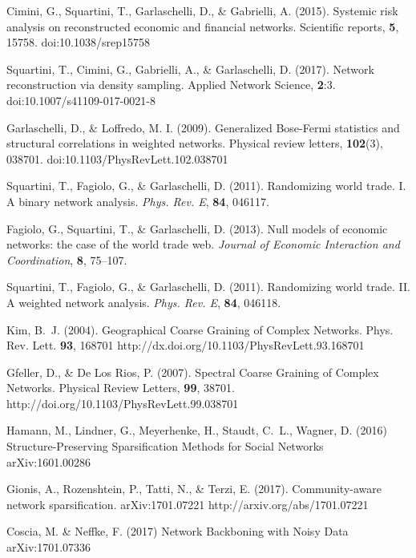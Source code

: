 \documentclass[aps,twocolumn,superscriptaddress]{revtex4-1}
\begin{document}
\begin{thebibliography}{99}
Cimini, G., Squartini, T., Garlaschelli, D., \& Gabrielli, A. (2015). Systemic risk analysis on reconstructed economic and financial networks. Scientific reports, {\bf 5}, 15758.
doi:10.1038/srep15758

Squartini, T., Cimini, G., Gabrielli, A., \& Garlaschelli, D. (2017). Network reconstruction via density sampling. 
Applied Network Science, {\bf 2}:3.
doi:10.1007/s41109-017-0021-8

Garlaschelli, D., \& Loffredo, M. I. (2009). Generalized Bose-Fermi statistics and structural correlations in weighted networks. Physical review letters, {\bf 102}(3), 038701.
doi:10.1103/PhysRevLett.102.038701


Squartini, T., Fagiolo, G., \& Garlaschelli, D. (2011). Randomizing world trade. I. A binary network analysis. {\em Phys. Rev. E}, {\bf 84}, 046117.

Fagiolo, G., Squartini, T., \& Garlaschelli, D. (2013). Null models of economic networks: the case of the world trade web. {\em Journal of Economic Interaction and Coordination}, {\bf 8}, 75--107.

Squartini, T., Fagiolo, G., \& Garlaschelli, D. (2011). Randomizing world trade. II. A weighted network analysis. {\em Phys. Rev. E}, {\bf 84}, 046118.



 Kim, B.~J. (2004). Geographical Coarse Graining of Complex Networks. Phys. Rev. Lett. {\bf 93}, 168701 http://dx.doi.org/10.1103/PhysRevLett.93.168701

 Gfeller, D., \& De Los Rios, P. (2007). Spectral Coarse Graining of Complex Networks. Physical Review Letters, {\bf 99}, 38701. http://doi.org/10.1103/PhysRevLett.99.038701



 Hamann, M., Lindner, G., Meyerhenke, H., Staudt, C.~L., Wagner, D. (2016) Structure-Preserving Sparsification Methods for Social Networks arXiv:1601.00286

Gionis, A.,  Rozenshtein, P., Tatti, N., \& Terzi, E. (2017). Community-aware network sparsification. arXiv:1701.07221 
http://arxiv.org/abs/1701.07221

 Coscia, M. \& Neffke, F. (2017) Network Backboning with Noisy Data arXiv:1701.07336




\end{thebibliography}
\end{document}
